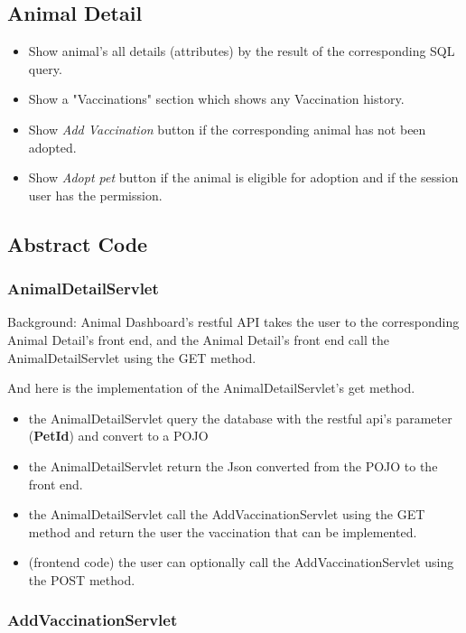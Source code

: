\documentclass[a4paper]{article}
\begin{document}
\hypertarget{animal_detail}{\subsection{Animal Detail}}

\begin{itemize}
	\item Show animal's all details (attributes) by the result of the corresponding SQL query.
	\item Show a "Vaccinations" section which shows any Vaccination history.
	\item Show \textit{Add Vaccination} button if the corresponding animal has not been adopted.
	\item Show \textit {Adopt pet} button if the animal is eligible for adoption and if the session user has the permission.
\end{itemize}


\subsection*{Abstract Code}

\subsubsection*{AnimalDetailServlet}

Background: Animal Dashboard's restful API takes the user to the corresponding Animal Detail's front end, and the Animal Detail's front end call the AnimalDetailServlet using the GET method.

And here is the implementation of the AnimalDetailServlet's get method.
\begin{itemize}
	\item the AnimalDetailServlet query the database with the restful api's parameter (\textbf{PetId}) and convert to a POJO
	\item the AnimalDetailServlet return the Json converted from the POJO to the front end.
	\item the AnimalDetailServlet call the AddVaccinationServlet using the GET method and return the user the vaccination that can be implemented.
	\item (frontend code) the user can optionally call the AddVaccinationServlet using the POST method.
\end{itemize}


\subsubsection*{AddVaccinationServlet}
\end{document}
